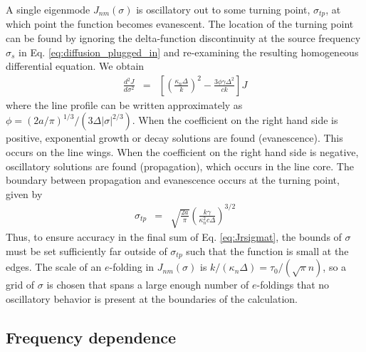 \documentclass{aastex63}
\newcommand{\be}{\begin{eqnarray}}
\newcommand{\ee}{\end{eqnarray}}
\begin{document}
A single eigenmode $J_{nm}(\sigma)$ is oscillatory out to some turning point, $\sigma_{tp}$, at which point the function becomes evanescent. The location of the turning point can be found by ignoring the delta-function discontinuity at the source frequency $\sigma_s$ in Eq. \ref{eq:diffusion_plugged_in} and re-examining the resulting homogeneous differential equation. We obtain
\be
\frac{d^2J}{d\sigma^2} & = & \left[ \left( \frac{\kappa_n \Delta }{k} \right)^2 - \frac{3\phi \gamma\Delta^2}{ck}\right] J
\ee
where the line profile can be written approximately as $\phi = (2a/\pi)^{1/3}/(3 \Delta |\sigma|^{2/3})$. When the coefficient on the right hand side is positive, exponential growth or decay solutions are found (evanescence). This occurs on the line wings. When the coefficient on the right hand side is negative, oscillatory solutions are found (propagation), which occurs in the line core. The boundary between propagation and evanescence occurs at the turning point, given by
\be
\sigma_{tp} & = & \sqrt{\frac{2a}{\pi}}\left( \frac{k \gamma}{ \kappa_n^2 c \Delta} \right)^{3/2}
\ee
Thus, to ensure accuracy in the final sum of Eq. \ref{eq:Jrsigmat}, the bounds of $\sigma$ must be set sufficiently far outside of $\sigma_{tp}$ such that the function is small at the edges. The scale of an $e$-folding in $J_{nm}(\sigma)$ is $k/(\kappa_n \Delta) = \tau_0 / (\sqrt{\pi} n)$, so a grid of $\sigma$ is chosen that spans a large enough number of $e$-foldings that no oscillatory behavior is present at the boundaries of the calculation.

\subsection{Frequency dependence}
\end{document}
